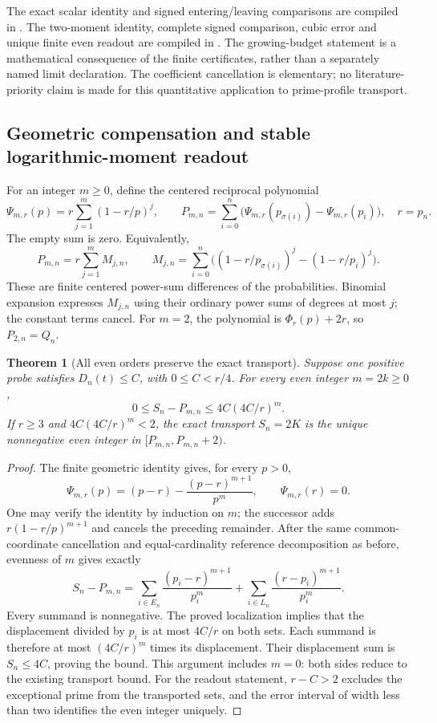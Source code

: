 \documentclass[11pt]{article}
\newtheorem{theorem}{Theorem}[section]
\theoremstyle{definition}
\begin{document}
\begin{flushleft}
The exact scalar identity and signed entering/leaving comparisons are
compiled in
.
The two-moment identity, complete signed comparison, cubic error and
unique finite even readout are compiled in
.
The growing-budget statement is a mathematical consequence of the
finite certificates, rather than a separately named limit declaration.
The coefficient cancellation is elementary; no literature-priority claim
is made for this quantitative application to prime-profile transport.
\end{flushleft}

\subsection{Geometric compensation and stable logarithmic-moment readout}

For an integer $m\ge0$, define the centered reciprocal polynomial
\[
 \Psi_{m,r}(p)=r\sum_{j=1}^m(1-r/p)^j,\qquad
 P_{m,n}=\sum_{i=0}^n
       \bigl(\Psi_{m,r}(p_{\sigma(i)})-\Psi_{m,r}(p_i)\bigr),
 \quad r=p_n.
\]
The empty sum is zero. Equivalently,
\[
 P_{m,n}=r\sum_{j=1}^m M_{j,n},\qquad
 M_{j,n}=\sum_{i=0}^n
    \bigl((1-r/p_{\sigma(i)})^j-(1-r/p_i)^j\bigr).
\]
These are finite centered power-sum differences of the probabilities.
Binomial expansion expresses $M_{j,n}$ using their ordinary power sums
of degrees at most $j$; the constant terms cancel.
For $m=2$, the polynomial is $\Phi_r(p)+2r$, so $P_{2,n}=Q_n$.

\begin{theorem}[All even orders preserve the exact transport]
Suppose one positive probe satisfies $D_n(t)\le C$, with
$0\le C<r/4$. For every even integer $m=2k\ge0$,
\[
 0\le S_n-P_{m,n}\le4C(4C/r)^m.
\]
If $r\ge3$ and $4C(4C/r)^m<2$, the exact transport $S_n=2K$
is the unique nonnegative even integer in $[P_{m,n},P_{m,n}+2)$.
\end{theorem}
\begin{proof}
The finite geometric identity gives, for every $p>0$,
\[
 \Psi_{m,r}(p)=(p-r)-\frac{(p-r)^{m+1}}{p^m},
 \qquad \Psi_{m,r}(r)=0.
\]
One may verify the identity by induction on $m$; the successor adds
$r(1-r/p)^{m+1}$ and cancels the preceding remainder.
After the same common-coordinate cancellation and equal-cardinality
reference decomposition as before, evenness of $m$ gives exactly
\[
 S_n-P_{m,n}=
 \sum_{i\in E_n}\frac{(p_i-r)^{m+1}}{p_i^m}
 +\sum_{i\in L_n}\frac{(r-p_i)^{m+1}}{p_i^m}.
\]
Every summand is nonnegative. The proved localization implies that
the displacement divided by $p_i$ is at most $4C/r$ on both sets.
Each summand is therefore at most $(4C/r)^m$ times its displacement.
Their displacement sum is $S_n\le4C$, proving the bound.
This argument includes $m=0$: both sides reduce to the existing
transport bound. For the readout statement, $r-C>2$ excludes
the exceptional prime from the transported sets, and the error
interval of width less than two identifies the even integer uniquely.
\end{proof}
\end{document}
